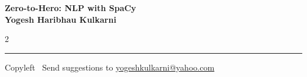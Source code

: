 \documentclass[8pt,landscape]{article}
\begin{document}
\footnotesize


\begin{center}
\Large{\textbf{Zero-to-Hero: NLP with SpaCy\\ Yogesh Haribhau Kulkarni}}
\end{center}

\begin{multicols}{2}

\end{multicols}

\rule{\linewidth}{0.25pt}
\scriptsize
Copyleft \textcopyleft\  Send suggestions to
\href{http://www.yogeshkulkarni.com}{yogeshkulkarni@yahoo.com}
\end{document}
